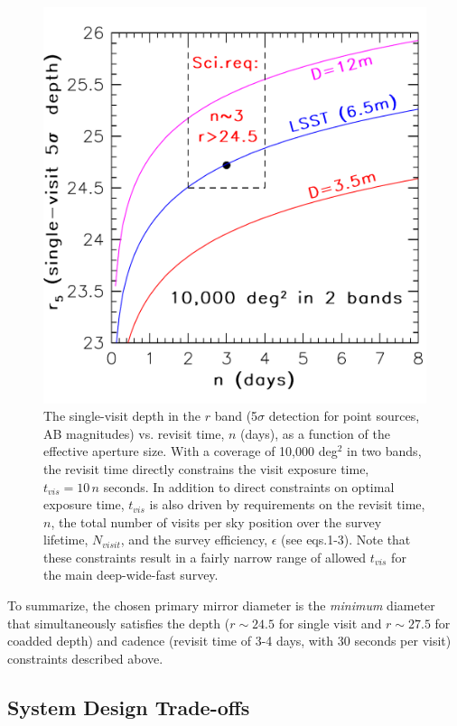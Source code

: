 \documentclass{emulateapj}
\begin{document}
\begin{figure}[t]
\includegraphics[width=1.0\hsize,clip]{singleDepth.pdf}
\caption{The single-visit depth in the $r$ band (5$\sigma$ detection for 
point sources, AB magnitudes) vs. revisit time, $n$ (days), as a function of 
the effective aperture size. With a coverage of 10,000 deg$^2$ in two bands, 
the revisit time directly constrains the visit exposure time, $t_{vis}=10\,n$ 
seconds. In addition to direct constraints on optimal exposure time, $t_{vis}$ 
is also driven by requirements on the revisit time, $n$, the total number of visits 
per sky position over the survey lifetime, $N_{visit}$, and the survey efficiency,
$\epsilon$ (see eqs.1-3). Note that these constraints result in a fairly narrow range of 
allowed $t_{vis}$ for the main deep-wide-fast survey.} 
\label{Fig:singleDepth}
\end{figure}

To summarize, the chosen primary mirror diameter is the {\it minimum}
diameter that simultaneously satisfies the depth ($r\sim24.5$ for single visit and 
$r\sim27.5$ for coadded depth) and cadence (revisit time of 3-4 days, 
with 30 seconds per visit) constraints described above.

\subsection{System Design Trade-offs}
\end{document}
